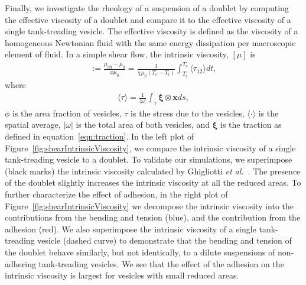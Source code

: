 \documentclass[prf,superscriptaddress,showkeys]{revtex4-1}
\newcommand{\xx}{\mathbf{x}}
\newcommand{\xxi}{\boldsymbol{\xi}}
\begin{document}
Finally, we investigate the rheology of a suspension of a doublet by
computing the effective viscosity of a doublet and compare it to the
effective viscosity of a single tank-treading vesicle. The effective
viscosity is defined as the viscosity of a homogeneous Newtonian fluid
with the same energy dissipation per macroscopic element of fluid.  In a
simple shear flow, the intrinsic viscosity, $[\mu]$ is
\begin{align*}
  [\mu]:= \frac{\mu_{\mathrm{eff}} - \mu_0}{\phi \mu_0} = 
  \frac{1}{\chi \mu_0 (T_e - T_i)} \int_{T_i}^{T_e} 
  \langle \tau_{12} \rangle dt,
\end{align*}
where
\begin{align*}
  \langle \tau \rangle = \frac{1}{|\omega|} \int_{\gamma}
    \xxi \otimes \xx ds,
\end{align*}
$\phi$ is the area fraction of vesicles, $\tau$ is the stress due to the
vesicles, $\langle \cdot \rangle$ is the spatial average, $|\omega|$ is
the total area of both vesicles, and $\xxi$ is the traction as defined
in equation~\eqref{eqn:traction}.  In the left plot of
Figure~\ref{fig:shearIntrinsicViscosity}, we compare the intrinsic
viscosity of a single tank-treading vesicle to a doublet.  To validate
our simulations, we superimpose (black marks) the intrinsic viscosity
calculated by Ghigliotti {\em et
al.}~\cite{GhigliottiBibenMisbah2010_JFM}.  The presence of the doublet
slightly increases the intrinsic viscosity at all the reduced
areas.  To further characterize the effect of adhesion, in the right
plot of Figure~\ref{fig:shearIntrinsicViscosity} we decompose the
intrinsic viscosity into the contributions from the bending and tension
(blue), and the contribution from the adhesion (red).  We also
superimpose the intrinsic viscosity of a single tank-treading
vesicle (dashed curve) to demonstrate that the bending and tension of
the doublet behave similarly, but not identically, to a dilute
suspensions of non-adhering tank-treading vesicles.  We see that the
effect of the adhesion on the intrinsic viscosity is largest for
vesicles with small reduced areas.
\end{document}
